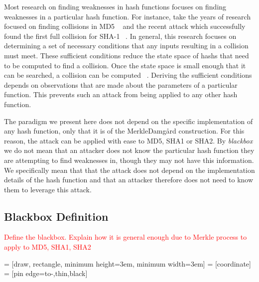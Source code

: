 \documentclass[letterpaper,twocolumn,10pt]{article}
\begin{document}
Most research on finding weaknesses in hash functions focuses on finding weaknesses in a particular hash function. For instance, take the years of research focused on finding collisions in MD5 ~\cite{klima2005finding, liang2007improved, wang2005break, klima2006tunnels} and the recent attack which successfully found the first full collision for SHA-1 ~\cite{stevens2017first}. In general, this research focuses on determining a set of necessary conditions that any inputs resulting in a collision must meet. These sufficient conditions reduce the state space of hashs that need to be computed to find a collision. Once the state space is small enough that it can be searched, a collision can be computed ~\cite{sasaki2006construct}. Deriving the sufficient conditions depends on observations that are made about the parameters of a particular function. This prevents such an attack from being applied to any other hash function. 

The paradigm we present here does not depend on the specific implementation of any hash function, only that it is of the Merkle{\textendash}Damg\r{a}rd construction. For this reason, the attack can be applied with ease to MD5, SHA1 or SHA2. By \emph{blackbox} we do not mean that an attacker does not know the particular hash function they are attempting to find weaknesses in, though they may not have this information. We specifically mean that that the attack does not depend on the implementation details of the hash function and that an attacker therefore does not need to know them to leverage this attack. 

\subsection{Blackbox Definition} \label{bbdef}
\textcolor{red}{Define the blackbox. Explain how it is general enough due to Merkle process to apply to MD5, SHA1, SHA2}

 = [draw, rectangle, minimum height=3em, minimum width=3em]
 = [coordinate]
 = [pin edge={to-,thin,black}]
\begin{center}
\end{center}
\end{document}
